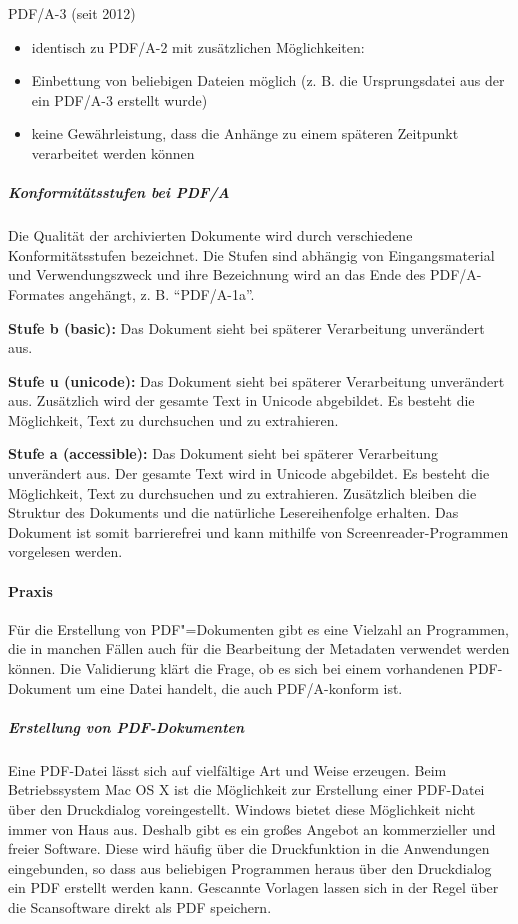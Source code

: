 PDF/A-3 (seit 2012)
\begin{itemize}
	\item identisch zu PDF/A-2 mit zusätzlichen Möglichkeiten:
	\item Einbettung von beliebigen Dateien möglich (z. B. die Ursprungsdatei aus der ein PDF/A-3 erstellt wurde)
	\item keine Gewährleistung, dass die Anhänge zu einem späteren Zeitpunkt verarbeitet werden können
\end{itemize}

\subparagraph{Konformitätsstufen bei PDF/A}
Die Qualität der archivierten Dokumente wird durch verschiedene Konformitätsstufen bezeichnet. Die Stufen sind abhängig von Eingangsmaterial und Verwendungszweck und ihre Bezeichnung wird an das Ende des PDF/A-Formates angehängt, z. B. "`PDF/A-1a"'.

{\bfseries Stufe b (basic):} Das Dokument sieht bei späterer Verarbeitung unverändert aus.

{\bfseries Stufe u (unicode):} Das Dokument sieht bei späterer Verarbeitung unverändert aus. Zusätzlich wird der gesamte Text in Unicode abgebildet. Es besteht die Möglichkeit, Text zu durchsuchen und zu extrahieren.

{\bfseries Stufe a (accessible):} Das Dokument sieht bei späterer Verarbeitung unverändert aus. Der gesamte Text wird in Unicode abgebildet. Es besteht die Möglichkeit, Text zu durchsuchen und zu extrahieren. Zusätzlich bleiben die Struktur des Dokuments und die natürliche Lesereihenfolge erhalten. Das Dokument ist somit barrierefrei und kann mithilfe von Screenreader-Programmen vorgelesen werden. 


\paragraph{Praxis}
Für die Erstellung von PDF"=Dokumenten gibt es eine Vielzahl an Programmen, die in manchen Fällen auch für die Bearbeitung der Metadaten verwendet werden können. Die Validierung klärt die Frage, ob es sich bei einem vorhandenen PDF-Dokument um eine Datei handelt, die auch PDF/A-konform ist.

\subparagraph{Erstellung von PDF-Dokumenten}
\label{pdf-dokumenteErstellen}
Eine PDF-Datei lässt sich auf vielfältige Art und Weise erzeugen. Beim Betriebssystem Mac OS X ist die Möglichkeit zur Erstellung einer PDF-Datei über den Druckdialog voreingestellt. Windows bietet diese Möglichkeit nicht immer von Haus aus. Deshalb gibt es ein großes Angebot an kommerzieller und freier Software. Diese wird häufig über die Druckfunktion in die Anwendungen eingebunden, so dass aus beliebigen Programmen heraus über den Druckdialog ein PDF erstellt werden kann. Gescannte Vorlagen lassen sich in der Regel über die Scansoftware direkt als PDF speichern. 

